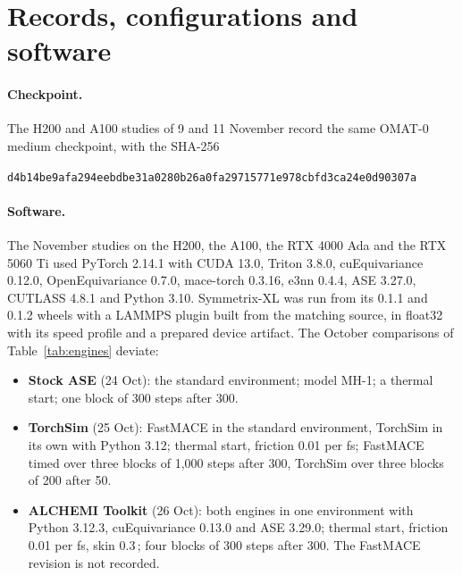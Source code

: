 \documentclass[11pt]{article}
\newcommand{\angstrom}{\text{\AA}}
\begin{document}
\section{Records, configurations and software}
\label{app:records}

\paragraph{Checkpoint.}
The H200 and A100 studies of 9 and 11 November record the same OMAT-0 medium checkpoint, with the SHA-256
\begin{center}
\small\texttt{d4b14be9afa294eebdbe31a0280b26a0fa29715771e978cbfd3ca24e0d90307a}
\end{center}

\paragraph{Software.}
The November studies on the H200, the A100, the RTX 4000 Ada and the RTX 5060 Ti used PyTorch 2.14.1 with CUDA
13.0, Triton 3.8.0, cuEquivariance 0.12.0, OpenEquivariance 0.7.0, mace-torch 0.3.16, e3nn 0.4.4, ASE 3.27.0,
CUTLASS 4.8.1 and Python 3.10. Symmetrix-XL was run from its 0.1.1 and 0.1.2 wheels with a LAMMPS plugin built
from the matching source, in float32 with its speed profile and a prepared device artifact. The October
comparisons of Table~\ref{tab:engines} deviate:
\begin{itemize}\setlength{\itemsep}{0.1em}
\item \textbf{Stock ASE} (24 Oct): the standard environment; model MH-1; a thermal start; one block of 300 steps
      after 300.
\item \textbf{TorchSim} (25 Oct): FastMACE in the standard environment, TorchSim in its own with Python 3.12;
      thermal start, friction 0.01 per fs; FastMACE timed over three blocks of 1{,}000 steps after 300, TorchSim
      over three blocks of 200 after 50.
\item \textbf{ALCHEMI Toolkit} (26 Oct): both engines in one environment with Python 3.12.3, cuEquivariance
      0.13.0 and ASE 3.29.0; thermal start, friction 0.01 per fs, skin 0.3\,\angstrom; four blocks of 300 steps
      after 300. The FastMACE revision is not recorded.
\end{itemize}
\end{document}
